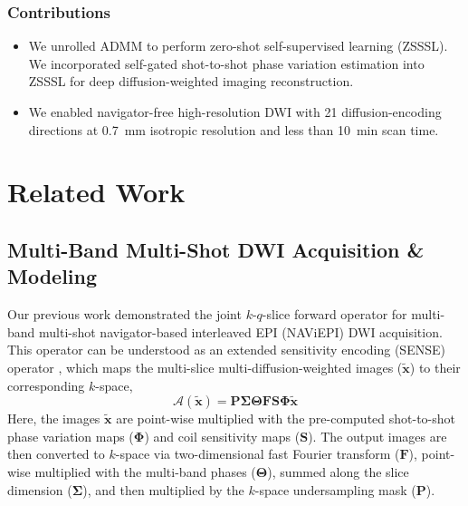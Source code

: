\documentclass[journal,twoside,web]{ieeecolor}
\begin{document}
	\subsubsection*{Contributions}
	\begin{itemize}
		\item We unrolled ADMM to perform zero-shot self-supervised learning (ZSSSL). We incorporated self-gated shot-to-shot phase variation estimation into ZSSSL for deep diffusion-weighted imaging reconstruction.
		\item We enabled navigator-free high-resolution DWI with 21 diffusion-encoding 
		directions at \SI{0.7}{\milli\meter} isotropic resolution 
		and less than \SI{10}{\minute} scan time.
	\end{itemize}


	\section{Related Work}


	\subsection{Multi-Band Multi-Shot DWI Acquisition \& Modeling} \label{SEC:FWD}

	Our previous work \cite{tan_2024_naviepi} demonstrated
	the joint $k$-$q$-slice forward operator
	for multi-band multi-shot navigator-based interleaved EPI (NAViEPI) DWI acquisition.
	This operator can be understood as
	an extended sensitivity encoding (SENSE) operator \cite{pruessmann_2001_gsense},
	which maps the multi-slice multi-diffusion-weighted images ($\mathbf{\tilde{x}}$)
	to their corresponding $k$-space,
	\begin{equation}
		\mathcal{A}(\mathbf{\tilde{x}}) = \mathbf{P \Sigma \Theta F S \Phi} \mathbf{\tilde{x}}
		\label{EQU:FWD}
	\end{equation}
	Here, the images $\mathbf{\tilde{x}}$ are point-wise multiplied
	with the pre-computed shot-to-shot phase variation maps ($\mathbf{\Phi}$)
	and coil sensitivity maps ($\mathbf{S}$).
	The output images are then converted to $k$-space
	via two-dimensional fast Fourier transform ($\mathbf{F}$),
	point-wise multiplied with the multi-band phases ($\mathbf{\Theta}$),
	summed along the slice dimension ($\mathbf{\Sigma}$),
	and then multiplied by the $k$-space undersampling mask ($\mathbf{P}$).
\end{document}
